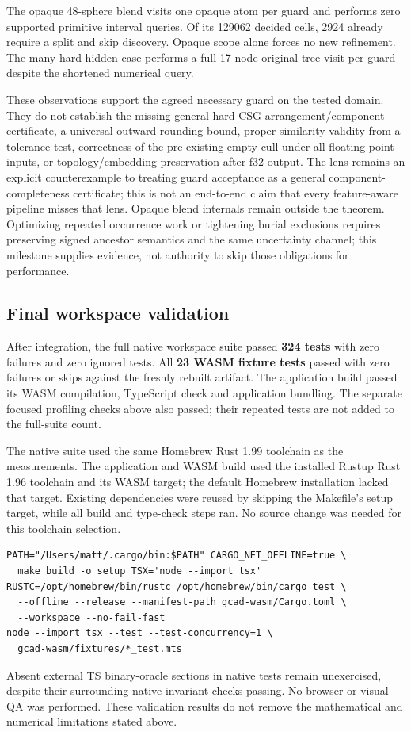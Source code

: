 \documentclass[11pt]{article}
\begin{document}
The opaque 48-sphere blend visits one opaque atom per guard and performs zero
supported primitive interval queries. Of its 129062 decided cells,
2924 already require a split and skip discovery. Opaque scope alone
forces no new refinement. The many-hard hidden case performs a full
17-node original-tree visit per guard despite the shortened numerical query.


These observations support the agreed necessary guard on the tested domain.
They do not establish the missing general hard-CSG arrangement/component
certificate, a universal outward-rounding bound, proper-similarity validity
from a tolerance test, correctness of the pre-existing empty-cull under all
floating-point inputs, or topology/embedding preservation after f32 output.
The lens remains an explicit counterexample to treating guard acceptance as
a general component-completeness certificate; this is not an end-to-end claim
that every feature-aware pipeline misses that lens. Opaque blend internals
remain outside the theorem. Optimizing repeated occurrence work or tightening
burial exclusions requires preserving signed ancestor semantics and the same
uncertainty channel; this milestone supplies evidence, not authority to skip
those obligations for performance.

\subsection{Final workspace validation}

After integration, the full native workspace suite passed \textbf{324 tests}
with zero failures and zero ignored tests. All \textbf{23 WASM fixture tests}
passed with zero failures or skips against the freshly rebuilt artifact.
The application build passed its WASM compilation, TypeScript check and
application bundling. The separate focused profiling checks above also passed;
their repeated tests are not added to the full-suite count.

The native suite used the same Homebrew Rust 1.99 toolchain as the measurements.
The application and WASM build used the installed Rustup Rust 1.96 toolchain
and its WASM target; the default Homebrew installation lacked that target.
Existing dependencies were reused by skipping the Makefile's setup
target, while all build and type-check steps ran. No source change was needed
for this toolchain selection.

\begin{verbatim}
PATH="/Users/matt/.cargo/bin:$PATH" CARGO_NET_OFFLINE=true \
  make build -o setup TSX='node --import tsx'
RUSTC=/opt/homebrew/bin/rustc /opt/homebrew/bin/cargo test \
  --offline --release --manifest-path gcad-wasm/Cargo.toml \
  --workspace --no-fail-fast
node --import tsx --test --test-concurrency=1 \
  gcad-wasm/fixtures/*_test.mts
\end{verbatim}

Absent external TS binary-oracle sections in native tests remain unexercised,
despite their surrounding native invariant checks passing. No browser or visual
QA was performed. These validation results do not remove the mathematical and
numerical limitations stated above.
\end{document}
